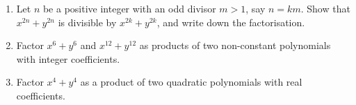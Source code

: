 \begin{enumerate}
\item[(a)] Let $n$ be a positive integer with an odd divisor $m>1$, say $n=km$. Show that $x^{2n}+y^{2n}$ is divisible by $x^{2k}+y^{2k}$, and write down the factorisation.
\item[(b)] Factor $x^6+y^6$ and $x^{12}+y^{12}$ as products of two non-constant polynomials with integer coefficients.
\item[(c)] Factor $x^4+y^4$ as a product of two quadratic polynomials with real coefficients.
\end{enumerate}
